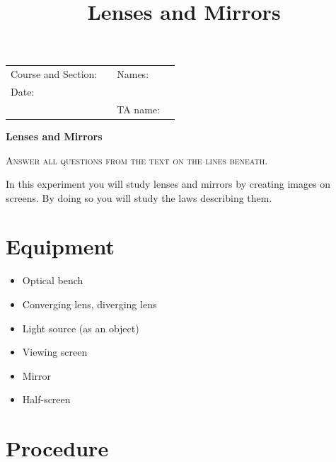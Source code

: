 \documentclass[11pt, a4paper]{article}
\title{Lenses and Mirrors}
\date{}
\author{}
\begin{document}
\thispagestyle{empty}
\noindent
\begin{tabularx}{\textwidth}{ll>{\raggedleft\arraybackslash}Xr}
    Course and Section: & \underline{\hspace{2cm}} & Names: & \underline{\hspace{6cm}}\\[0.3cm]
    Date: & \underline{\hspace{2cm}} & & \underline{\hspace{6cm}}\\[0.3cm]
    & & TA name: & \underline{\hspace{6cm}}
\end{tabularx}
\bigskip
\begin{center}
    {\Huge \bf Lenses and Mirrors}\\
\end{center}
\begin{center}
\textsc{Answer all questions from the text on the lines beneath.}
\end{center}
In this experiment you will study lenses and mirrors by creating images on screens.
By doing so you will study the laws describing them.

\section{Equipment}
\begin{minipage}{0.49\textwidth}
    \begin{itemize}
        \item Optical bench
        \item Converging lens, diverging lens
        \item Light source (as an object)
    \end{itemize}
\end{minipage}
\begin{minipage}{0.49\textwidth}
    \begin{itemize}
        \item Viewing screen
        \item Mirror
        \item Half-screen
    \end{itemize}
\end{minipage}

\section{Procedure}
\end{document}
